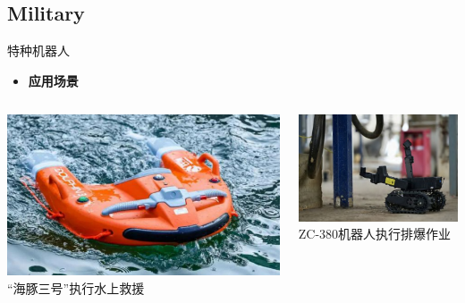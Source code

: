 \documentclass{beamer}
\begin{document}
\subsection{Military}
\begin{frame}{特种机器人}
\setlength{\leftmargini}{0mm}
\begin{itemize}
\item \textbf{应用场景}
\smallskip
\scriptsize{}
\end{itemize}

\begin{columns}[c, onlytextwidth]
\begin{column}{0.33\textwidth}
\centering
\includegraphics[width=\textwidth, keepaspectratio]{military/1.jpg}
\smallskip
{\tiny “海豚三号”执行水上救援}
\end{column}\hfill

\begin{column}{0.295\textwidth}
\centering
\includegraphics[width=\textwidth, keepaspectratio]{military/2.jpg}
\smallskip
{\tiny ZC-380机器人执行排爆作业}
\end{column}\hfill


\end{columns}
\end{frame}
\end{document}
